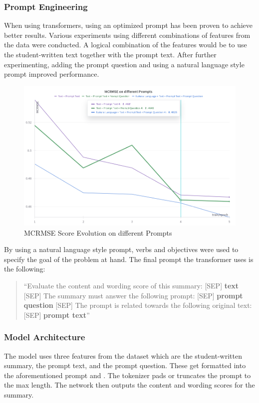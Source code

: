 \subsubsection{Prompt Engineering}
When using transformers, using an optimized prompt has been proven to achieve better results.
Various experiments using different combinations of features from the data were conducted.
A logical combination of the features would be to use the student-written text together with the prompt text.
After further experimenting, adding the prompt question and using a natural language style prompt improved performance.

\begin{figure}[H]
\begin{center}
\includegraphics[keepaspectratio, width=\textwidth]{img/prompts.png}
\caption{MCRMSE Score Evolution on different Prompts}
\label{fig:prompts}
\end{center}
\end{figure}

\vspace{1em}

By using a natural language style prompt, verbs and objectives were used to specify the goal of the problem at hand.
The final prompt the transformer uses is the following:

\begin{quote}
    ``Evaluate the content and wording score of this summary: [SEP] \textbf{text} [SEP] The summary must answer the following prompt: [SEP] \textbf{prompt question} [SEP] The prompt is related towards the following original text: [SEP] \textbf{prompt text}''
\end{quote}

\subsubsection{Model Architecture}
The model uses three features from the dataset which are the student-written summary, the prompt text, and the prompt question.
These get formatted into the aforementioned prompt and . The tokenizer pads or truncates the prompt to the max length.
The network then outputs the content and wording scores for the summary.

